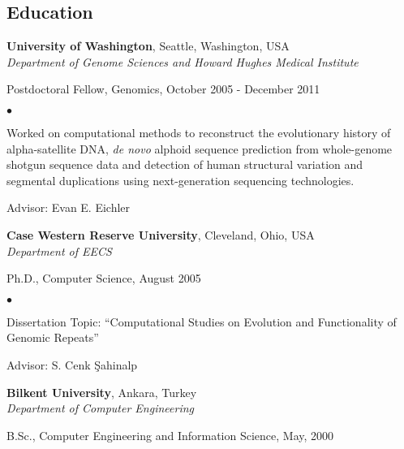 \documentclass[margin,line]{res}
\newenvironment{list1}{
  \begin{list}{\ding{113}}{%
      \setlength{\itemsep}{0in}
      \setlength{\parsep}{0in} \setlength{\parskip}{0in}
      \setlength{\topsep}{0in} \setlength{\partopsep}{0in} 
      \setlength{\leftmargin}{0.17in}}}{\end{list}}
\newenvironment{list2}{
  \begin{list}{$\bullet$}{%
      \setlength{\itemsep}{0.1cm}
      \setlength{\parsep}{0in} \setlength{\parskip}{0in}
      \setlength{\topsep}{0in} \setlength{\partopsep}{0in} 
      \setlength{\leftmargin}{0.2in}}}{\end{list}}
\begin{document}
\begin{resume}
  \section{\sc Education}
          {\bf University of Washington}, Seattle, Washington, USA\\
          {\em Department of Genome Sciences and Howard Hughes Medical Institute} \\
          \vspace*{-.1in}
          \begin{list1}
          \item[] Postdoctoral Fellow, Genomics, October 2005 - December 2011
            \begin{list2}
              \vspace*{.05in}
            \item
              Worked on computational methods to reconstruct
              the evolutionary history of alpha-satellite DNA, {\it de novo} alphoid sequence prediction
              from whole-genome shotgun sequence data and detection of human structural variation and segmental duplications using next-generation
              sequencing technologies.
            \item Advisor: Evan E. Eichler
            \end{list2}
          \end{list1}
          
          {\bf Case Western Reserve University}, Cleveland, Ohio, USA\\
          {\em Department of EECS} \\
          \vspace*{-.1in}
          \begin{list1}
          \item[] Ph.D., Computer Science, August 2005
            \begin{list2}
              \vspace*{.05in}
            \item Dissertation Topic:  ``Computational Studies on Evolution and Functionality of Genomic Repeats''
            \item Advisor:  S. Cenk \c{S}ahinalp
            \end{list2}
          \end{list1}
          
          {\bf Bilkent University}, Ankara, Turkey \\
          {\em Department of Computer Engineering}\\ 
          \vspace*{-.1in}
          \begin{list1}
          \item[] B.Sc., Computer Engineering and Information Science,  May, 2000
          \end{list1}
          

\end{resume}
\end{document}
